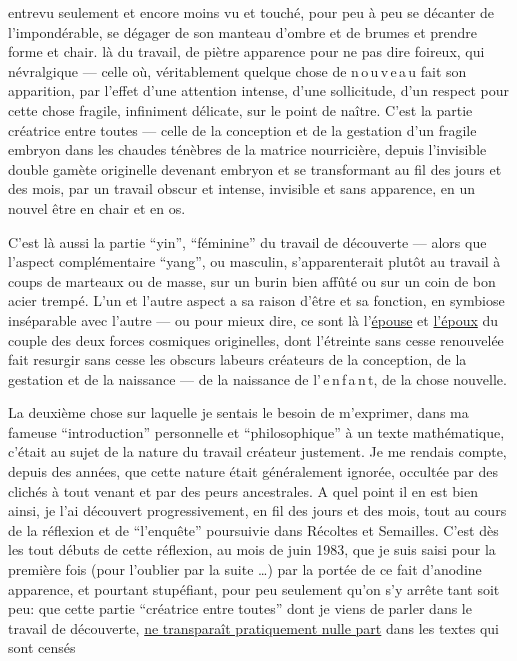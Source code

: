 entrevu seulement et encore moins vu et touché, pour peu à peu se
décanter de l'impondérable, se dégager de son manteau d'ombre et de brumes et prendre forme et chair.
là du travail,
de piètre apparence pour ne pas dire foireux, qui
névralgique --- celle où, véritablement quelque chose de n\,o\,u\,v\,e\,a\,u fait son apparition,
par l'effet d'une attention intense, d'une sollicitude, d'un respect pour cette chose fragile,
infiniment délicate, sur le point de naître. C'est la partie créatrice entre toutes ---
celle de la conception et de la gestation d'un fragile embryon dans les chaudes ténèbres
de la matrice nourricière,  depuis l'invisible double gamète
 originelle devenant embryon et se transformant au fil des jours et des mois,
par un travail obscur et intense, invisible et sans apparence, en un nouvel être en chair et en os.

C'est là aussi la partie ``yin'', ``féminine\deleted{\unsure{,}}'' du travail de découverte
--- alors que  l'aspect complémentaire ``yang'', ou masculin,
s'apparenterait plutôt  au travail à coups de marteaux ou de masse,
sur un burin bien affûté ou sur un coin de bon acier trempé.
L'un et l'autre aspect a sa raison d'être et sa fonction, en symbiose inséparable  avec l'autre --- ou pour mieux dire, ce sont là l'\uline{épouse} et \uline{l'époux}
du couple des deux forces cosmiques originelles, dont l'étreinte
sans cesse renouvelée fait resurgir sans cesse les obscurs labeurs créateurs de la conception,
de la gestation et de la naissance --- de la naissance de l'\,e\,n\,f\,a\,n\,t, de la chose nouvelle.

La deuxième chose sur laquelle je sentais le besoin de m'exprimer, dans ma fameuse ``introduction''
 personnelle et ``philosophique'' à un texte mathématique,
c'était au sujet de la nature du travail créateur justement.
Je me rendais compte, depuis des années, que cette nature était généralement ignorée,
occultée par des clichés à tout venant et par des peurs ancestrales.
A quel point il en est bien ainsi, je l'ai découvert progressivement, en fil des jours et des mois,
tout au cours de la réflexion et de ``l'enquête'' poursuivie dans Récoltes et Semailles.
C'est dès les tout débuts de cette réflexion, au mois de juin 1983, que je suis saisi pour la première fois
(pour l'oublier par la suite \ldots) par la portée de ce fait d'anodine apparence,
et pourtant  stupéfiant, pour peu seulement qu'on s'y arrête tant soit peu:
que cette partie ``créatrice entre toutes'' dont je viens de parler dans le travail de découverte,
\uline{ne transparaît pratiquement nulle part} dans les textes qui sont censés

